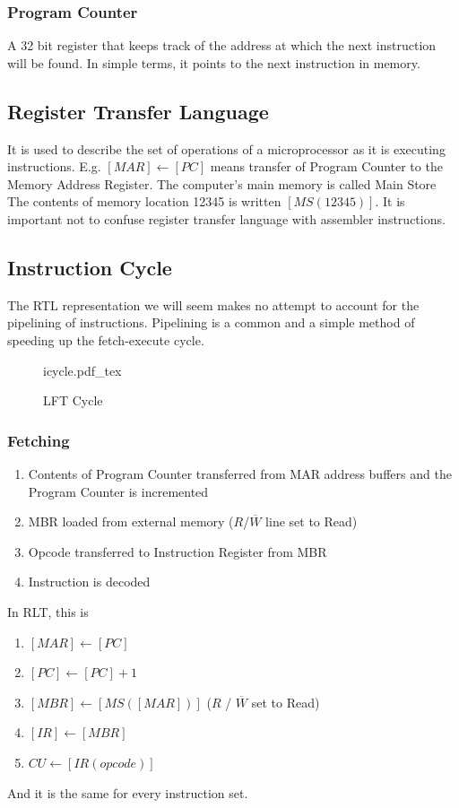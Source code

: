 \documentclass[a4paper]{article}
\newcommand{\incfig}[2][1]{%
    \def\svgwidth{#1\columnwidth}
    {#2.pdf_tex}
}
\theoremstyle{plain}
\theoremstyle{definition}
\theoremstyle{remark}
\begin{document}
\subsubsection{Program Counter}
A 32 bit register that keeps track of the address at which the next instruction will be found. In simple terms, it points to the next instruction in memory.
\subsection{Register Transfer Language}
It is used to describe the set of operations of a microprocessor as it is executing instructions. E.g. $[MAR] \leftarrow [PC]$ means transfer of Program Counter to the Memory Address Register. The computer's main memory is called Main Store The contents of memory location 12345 is written $[MS\left( 12345 \right) ]$. It is important not to confuse register transfer language with assembler instructions.
\subsection{Instruction Cycle}
The RTL representation we will seem makes no attempt to account for the pipelining of instructions. Pipelining is a common and a simple method of speeding up the fetch-execute cycle.
\begin{figure}[ht]
    \centering
    \incfig{icycle}
    \caption{LFT Cycle}
    \label{fig:icycle}
\end{figure}
\subsubsection{Fetching}
\begin{enumerate}
	\item Contents of Program Counter transferred from MAR address buffers and the Program Counter is incremented
	\item MBR loaded from external memory ($R$/$\overline{W}$ line set to Read)
	\item Opcode transferred to Instruction Register from MBR
	\item Instruction is decoded
\end{enumerate}
In RLT, this is 
 \begin{enumerate}
	 \item $[MAR] \leftarrow [PC]$ 
	 \item $[PC] \leftarrow [PC]+1$
	 \item $[MBR] \leftarrow [MS([MAR])]$ ($R$ / $\overline{W}$ set to Read)
	 \item $[IR] \leftarrow [MBR]$
	 \item  $CU \leftarrow [IR(opcode)]$
\end{enumerate}
And it is the same for every instruction set.
\end{document}
